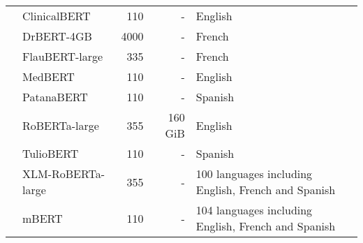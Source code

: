 {\begin{tabular}{clrrl}
 & ClinicalBERT & 110 & - & English \\
 & DrBERT-4GB & 4000 & - & French \\
 & FlauBERT-large & 335 & - & French \\
 & MedBERT & 110 & - & English \\
 & PatanaBERT & 110 & - & Spanish \\
 & RoBERTa-large & 355 & 160 GiB & English \\
 & TulioBERT & 110 & - & Spanish \\
 & XLM-RoBERTa-large & 355 & - & 100 languages including English, French and Spanish \\
 & mBERT \cite{devlin2019bert} & 110 & - & 104 languages including English, French and Spanish \\
\bottomrule
\end{tabular}}